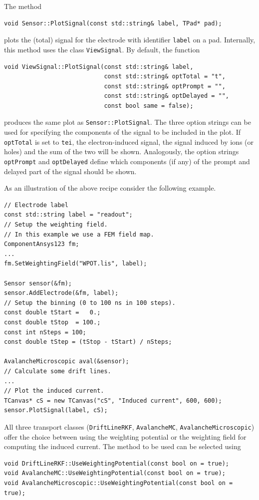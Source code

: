 The method 
\begin{lstlisting}
void Sensor::PlotSignal(const std::string& label, TPad* pad);
\end{lstlisting}
plots the (total) signal for the electrode with identifier \texttt{label} 
on a pad.
Internally, this method uses the class \texttt{ViewSignal}. 
By default, the function
\begin{lstlisting}
void ViewSignal::PlotSignal(const std::string& label,
                            const std::string& optTotal = "t",
                            const std::string& optPrompt = "",
                            const std::string& optDelayed = "",
                            const bool same = false);
\end{lstlisting} 
produces the same plot as \texttt{Sensor::PlotSignal}. 
The three option strings can be used for specifying the components of the 
signal to be included in the plot. If \texttt{optTotal} is set to \texttt{tei}, the electron-induced signal, the signal induced by ions (or holes) and the sum of the two will be shown. Analogously, the option strings \texttt{optPrompt} and \texttt{optDelayed} define which components (if any) of the 
prompt and delayed part of the signal should be shown. 

As an illustration of the above recipe consider the following example. 
\begin{lstlisting}
// Electrode label
const std::string label = "readout";
// Setup the weighting field.
// In this example we use a FEM field map.
ComponentAnsys123 fm;
...
fm.SetWeightingField("WPOT.lis", label);

Sensor sensor(&fm);
sensor.AddElectrode(&fm, label);
// Setup the binning (0 to 100 ns in 100 steps).
const double tStart =   0.;
const double tStop  = 100.;
const int nSteps = 100;
const double tStep = (tStop - tStart) / nSteps;

AvalancheMicroscopic aval(&sensor);
// Calculate some drift lines.
...
// Plot the induced current.
TCanvas* cS = new TCanvas("cS", "Induced current", 600, 600);
sensor.PlotSignal(label, cS);
\end{lstlisting}

All three transport classes (\texttt{DriftLineRKF}, \texttt{AvalancheMC}, \texttt{AvalancheMicroscopic}) offer the choice 
between using the weighting potential or the weighting field for computing 
the induced current. The method to be used can be selected using
\begin{lstlisting}
void DriftLineRKF::UseWeightingPotential(const bool on = true);
void AvalancheMC::UseWeightingPotential(const bool on = true);
void AvalancheMicroscopic::UseWeightingPotential(const bool on = true);
\end{lstlisting} 

